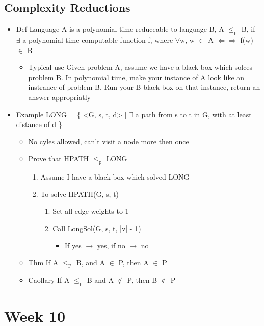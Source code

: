 \documentclass[11pt]{article}
\begin{document}
\subsection{Complexity Reductions}
\label{sec:org1aad090}
\begin{itemize}
\item Def
Language A is a polynomial time reduceable to language B, A \(\le_{\text{p}}\) B, if \(\exists\) a polynomial time computable function f, 
where \(\forall\)w, w \(\in\) A \(\Leftarrow \Rightarrow\) f(w) \(\in\) B
\begin{itemize}
\item Typical use
Given problem A, assume we have a black box which solces problem B. In polynomial time, make your instance of A
look like an instrance of problem B. Run your B black box on that instance, return an answer appropriatly
\end{itemize}
\item Example
LONG = \{ <G, s, t, d> | \(\exists\) a path from s to t in G, with at least distance of d \} 
\begin{itemize}
\item No cyles allowed, can't visit a node more then once
\item Prove that HPATH \(\le_{\text{p}}\) LONG
\begin{enumerate}
\item Assume I have a black box which solved LONG
\item To solve HPATH(G, s, t)
\begin{enumerate}
\item Set all edge weights to 1
\item Call LongSol(G, s, t, |v| - 1)
\begin{itemize}
\item If yes \(\rightarrow\) yes, if no \(\rightarrow\) no
\end{itemize}
\end{enumerate}
\end{enumerate}
\end{itemize}
\begin{itemize}
\item Thm
If A \(\le_{\text{P}}\) B, and A \(\in\) P, then A \(\in\) P
\item Caollary
If A \(\le_{\text{p}}\) B and A \(\notin\) P, then B \(\notin\) P
\end{itemize}
\end{itemize}
\section{Week 10}
\label{sec:orge06c4de}
\end{document}
